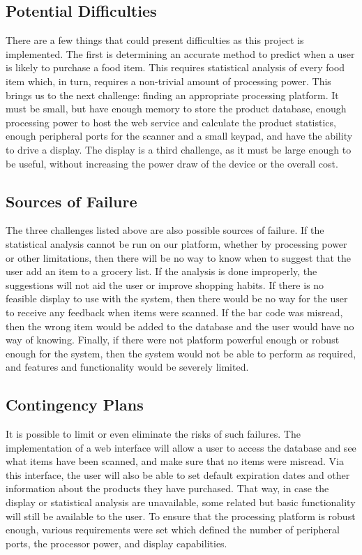 \documentclass[11pt]{article} %
\begin{document}
\subsection{Potential Difficulties}
\noindent There are a few things that could present difficulties as this project is implemented. The first is determining an accurate method to predict when a user is likely to purchase a food item. This requires statistical analysis of every food item which, in turn, requires a non-trivial amount of processing power. This brings us to the next challenge: finding an appropriate processing platform. It must be small, but have enough memory to store the product database, enough processing power to host the web service and calculate the product statistics, enough peripheral ports for the scanner and a small keypad, and have the ability to drive a display. The display is a third challenge, as it must be large enough to be useful, without increasing the power draw of the device or the overall cost. 

\subsection{Sources of Failure}
\noindent The three challenges listed above are also possible sources of failure. If the statistical analysis cannot be run on our platform, whether by processing power or other limitations, then there will be no way to know when to suggest that the user add an item to a grocery list. If the analysis is done improperly, the suggestions will not aid the user or improve shopping habits. If there is no feasible display to use with the system, then there would be no way for the user to receive any feedback when items were scanned. If the bar code was misread, then the wrong item would be added to the database and the user would have no way of knowing. Finally, if there were not platform powerful enough or robust enough for the system, then the system would not be able to perform as required, and features and functionality would be severely limited.

\subsection {Contingency Plans}
\noindent It is possible to limit or even eliminate the risks of such failures. The implementation of a web interface will allow a user to access the database and see what items have been scanned, and make sure that no items were misread. Via this interface, the user will also be able to set default expiration dates and other information about the products they have purchased. That way, in case the display or statistical analysis are unavailable, some related but basic functionality will still be available to the user. To ensure that the processing platform is robust enough, various requirements were set which defined the number of peripheral ports, the processor power, and display capabilities.
\end{document}
